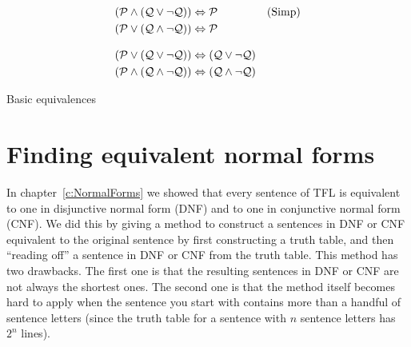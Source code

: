 \begin{table}
\begin{align*}
(\mathcal{P} \land (\mathcal{Q} \lor \lnot\mathcal{Q})) & \Leftrightarrow \mathcal{P}  && \text{(Simp)}\\
(\mathcal{P} \lor (\mathcal{Q} \land \lnot\mathcal{Q})) & \Leftrightarrow \mathcal{P}\\[2ex]
(\mathcal{P} \lor (\mathcal{Q} \lor \lnot\mathcal{Q})) & \Leftrightarrow (\mathcal{Q} \lor \lnot\mathcal{Q}) \\
(\mathcal{P} \land (\mathcal{Q} \land \lnot\mathcal{Q})) & \Leftrightarrow (\mathcal{Q} \land \lnot\mathcal{Q})
\end{align*}
\caption{Basic equivalences}
\label{tab:equivalences}
\end{table}

\section{Finding equivalent normal forms}

In chapter~\ref{c:NormalForms} we showed that every sentence of TFL is equivalent to one in disjunctive normal form (DNF) and to one in conjunctive normal form (CNF).  We did this by giving a method to construct a sentences in DNF or CNF equivalent to the original sentence by first constructing a truth table, and then ``reading off'' a sentence in DNF or CNF from the truth table.  This method has two drawbacks. The first one is that the resulting sentences in DNF or CNF are not always the shortest ones.  The second one is that the method itself becomes hard to apply when the sentence you start with contains more than a handful of sentence letters (since the truth table for a sentence with $n$ sentence letters has $2^n$ lines).

